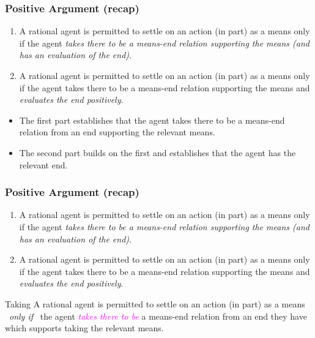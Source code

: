 \documentclass[noamssymb,
]{beamer} %
\newcommand{\hozlinedash}[0]{%
  \noindent\hdashrule[0.5ex][c]{\textwidth}{.1pt}{2.5pt}
}
\begin{document}
\begin{frame}
  \frametitle{Positive Argument (recap)}

  \begin{enumerate}
  \item A rational agent is permitted to settle on an action (in part) as a means only if the agent \emph{takes there to be a means-end relation supporting the means (and has an evaluation of the end)}.
  \item A rational agent is permitted to settle on an action (in part) as a means only if the agent takes there to be a means-end relation supporting the means and \emph{evaluates the end positively}.
  \end{enumerate}
  
  \begin{itemize}
  \item The first part establishes that the agent takes there to be a means-end relation from an end supporting the relevant means.
  \item The second part builds on the first and establishes that the agent has the relevant end.
  \end{itemize}

\end{frame}


\begin{frame}
  \frametitle{Positive Argument (recap)}

  \begin{enumerate}
  \item A rational agent is permitted to settle on an action (in part) as a means only if the agent \emph{takes there to be a means-end relation supporting the means (and has an evaluation of the end)}.
  \item A rational agent is permitted to settle on an action (in part) as a means only if the agent takes there to be a means-end relation supporting the means and \emph{evaluates the end positively}.
  \end{enumerate}

  \hozlinedash
  {\footnotesize
  \begin{block}{Taking}
    A rational agent is permitted to settle on an action (in part) as a means
    \newline
    \mbox{ }\hfill\emph{only if}\hfill\mbox{ }
    \newline
    the agent \textcolor{fuchsia}{\emph{takes there to be}}  a means-end relation from an end they have which supports taking the relevant means.
  \end{block}
  }
\end{frame}
\end{document}
